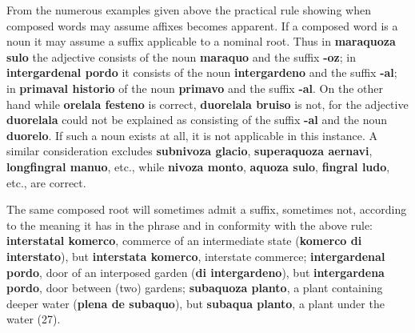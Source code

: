 From the numerous examples given above the practical rule showing when composed words may assume affixes becomes apparent. If a composed word is a noun it may assume a suffix applicable to a nominal root\footnotemark[1]. Thus in \textbf{maraquoza sulo} the adjective consists of the noun \textbf{maraquo} and the suffix \textbf{-oz}; in \textbf{intergardenal pordo} it consists of the noun \textbf{intergardeno} and the suffix \textbf{-al}; in \textbf{primaval historio} of the noun \textbf{primavo} and the suffix \textbf{-al}. On the other hand while \textbf{orelala festeno} is correct, \textbf{duorelala bruiso} is not, for the adjective \textbf{duorelala} could not be explained as consisting of the suffix \textbf{-al} and the noun \textbf{duorelo}. If such a noun exists at all, it is not applicable in this instance. A similar consideration excludes \textbf{subnivoza glacio}, \textbf{superaquoza aernavi}, \textbf{longfingral manuo}, etc., while \textbf{nivoza monto}, \textbf{aquoza sulo}, \textbf{fingral ludo}, etc., are correct. 

The same composed root will sometimes admit a suffix, sometimes not, according to the meaning it has in the phrase and in conformity with the above rule: \textbf{interstatal komerco}, commerce of an intermediate state (\textbf{komerco di interstato}), but \textbf{interstata komerco}, interstate commerce; \textbf{intergardenal pordo}, door of an interposed garden (\textbf{di intergardeno}), but \textbf{intergardena pordo}, door between (two) gardens; \textbf{subaquoza planto}, a plant containing deeper water (\textbf{plena de subaquo}), but \textbf{subaqua planto}, a plant under the water (27). 

